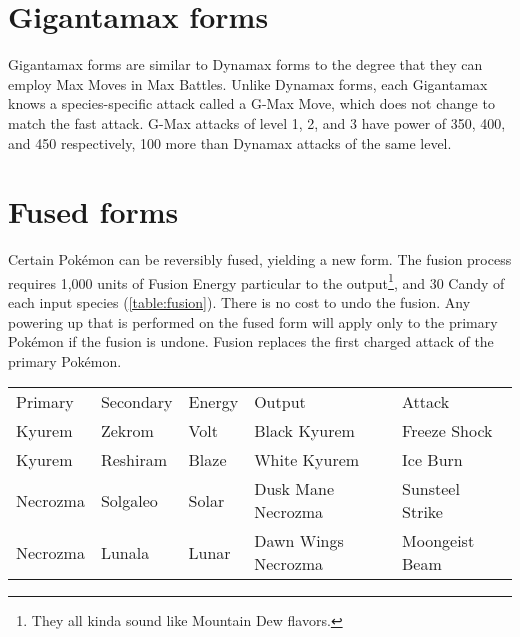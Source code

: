 \section{Gigantamax forms}
\label{sec:gmax}
Gigantamax forms are similar to Dynamax forms to the degree that they can
  employ Max Moves in Max Battles.
Unlike Dynamax forms, each Gigantamax knows a species-specific attack
  called a G-Max Move, which does not change to match the fast attack.
G-Max attacks of level 1, 2, and 3 have power of 350, 400, and 450
  respectively, 100 more than Dynamax attacks of the same level.


\section{Fused forms}
\label{sec:fusion}
Certain Pokémon can be reversibly fused, yielding a new form.
The fusion process requires 1,000 units of Fusion Energy particular to the output\footnote{They all kinda sound like Mountain Dew flavors.},
 and 30 Candy of each input species (\autoref{table:fusion}).
There is no cost to undo the fusion.
Any powering up that is performed on the fused form will apply only to the primary
  Pokémon if the fusion is undone.
Fusion replaces the first charged attack of the primary Pokémon.
\begin{table}[ht]
\centering
\begin{tabular}{lllll}
  Primary & Secondary & Energy & Output & Attack\\
\Midrule
  Kyurem & Zekrom & Volt & Black Kyurem & Freeze Shock \\
  Kyurem & Reshiram & Blaze & White Kyurem & Ice Burn\\
  Necrozma & Solgaleo & Solar & Dusk Mane Necrozma & Sunsteel Strike\\
  Necrozma & Lunala & Lunar & Dawn Wings Necrozma & Moongeist Beam\\
\end{tabular}
\end{table}


